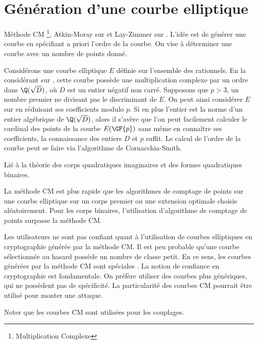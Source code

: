 \chapter{Génération d'une courbe elliptique}
Méthode CM \footnote{Multiplication Complexe}, Atkin-Moray sur  et Lay-Zimmer sur . L'idée est de générer une courbe en spécifiant a priori l'ordre de la courbe. On vise à déterminer une courbe avec un nombre de points donné.

Considérons une courbe elliptique $E$ définie sur l'ensemble des rationnels. En la considérant sur \C, cette courbe possède une multiplication complexe par un ordre dans $\Q(\sqrt{D})$, où $D$ est un entier négatif non carré. Supposons que $p > 3$, un nombre premier ne divisant pas le discriminant de $E$. On peut ainsi considérer $E$ sur  en réduisant ses coefficients modulo $p$. Si en plus l'entier est la norme d'un entier algébrique de $\Q(\sqrt{D})$, alors il s'avère que l'on peut facilement calculer le cardinal des points de la courbe $E(\GF{p})$ sans même en connaître ses coefficients, la connaissance des entiers $D$ et $p$ suffit. Le calcul de l'ordre de la courbe peut se faire via l'algorithme de Cornacchia-Smith.

Lié à la théorie des corps quadratiques imaginaires et des formes quadratiques binaires.

La méthode CM est plus rapide que les algorithmes de comptage de points sur une courbe elliptique sur un corps premier ou une extension optimale choisie aléatoirement. Pour les corps binaires, l'utilisation d'algorithme de comptage de points surpasse la méthode CM.

Les utilisateurs ne sont pas confiant quant à l'utilisation de courbes elliptiques en cryptographie générée par la méthode CM. Il est peu probable qu'une courbe sélectionnée au hasard possède un nombre de classe petit. En ce sens, les courbes générées par la méthode CM sont \og spéciales \fg{}. La notion de confiance en cryptographie est fondamentale. On préfère utiliser des courbes plus génériques, qui ne possèdent pas de spécificité. La particularité des courbes CM pourrait être utilisé pour monter une attaque. 

Noter que les courbes CM sont utilisées pour les couplages.